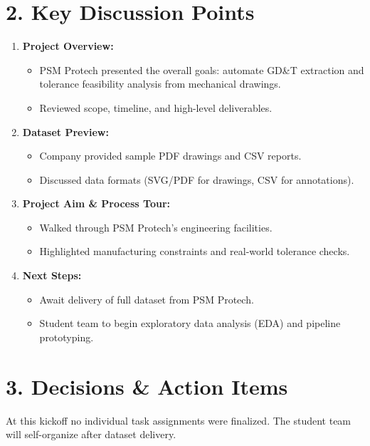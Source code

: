 \documentclass[a4paper,12pt]{article}
\begin{document}
\section*{2. Key Discussion Points}
\begin{enumerate}[label=\arabic*.,leftmargin=*]
  \item \textbf{Project Overview:} 
    \begin{itemize}[noitemsep]
      \item PSM Protech presented the overall goals: automate GD\&T extraction and tolerance feasibility analysis from mechanical drawings.
      \item Reviewed scope, timeline, and high-level deliverables.
    \end{itemize}
  \item \textbf{Dataset Preview:}
    \begin{itemize}[noitemsep]
      \item Company provided sample PDF drawings and CSV reports.
      \item Discussed data formats (SVG/PDF for drawings, CSV for annotations).
    \end{itemize}
  \item \textbf{Project Aim \& Process Tour:}
    \begin{itemize}[noitemsep]
      \item Walked through PSM Protech’s engineering facilities.
      \item Highlighted manufacturing constraints and real-world tolerance checks.
    \end{itemize}
  \item \textbf{Next Steps:}
    \begin{itemize}[noitemsep]
      \item Await delivery of full dataset from PSM Protech.
      \item Student team to begin exploratory data analysis (EDA) and pipeline prototyping.
    \end{itemize}
\end{enumerate}

\section*{3. Decisions \& Action Items}
At this kickoff no individual task assignments were finalized. The student team will self-organize after dataset delivery. 
\end{document}
